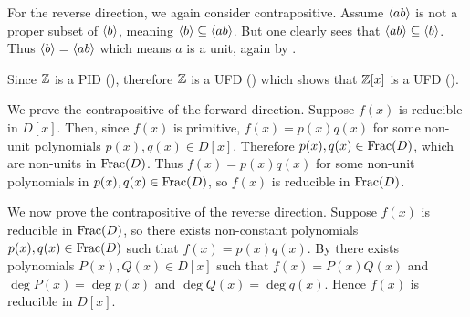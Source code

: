 \begin{questions}
    For the reverse direction, we again consider contrapositive. Assume $\left\langle ab\right\rangle$ is not a proper subset of $\left\langle b\right\rangle$, meaning $\left\langle b\right\rangle \subseteq \left\langle ab\right\rangle$. But one clearly sees that $\left\langle ab\right\rangle \subseteq \left\langle b\right\rangle$. Thus $\left\langle b\right\rangle = \left\langle ab\right\rangle$ which means $a$ is a unit, again by .

    \item Since $\mathbb{Z}$ is a PID (), therefore $\mathbb{Z}$ is a UFD () which shows that $\mathbb{Z}[x]$ is a UFD ().
    
    \item We prove the contrapositive of the forward direction. Suppose $f(x)$ is reducible in $D[x]$. Then, since $f(x)$ is primitive, $f(x) = p(x)q(x)$ for some non-unit polynomials $p(x), q(x) \in D[x]$. Therefore $p(x), q(x) \in \mathrm{Frac}(D)$, which are non-units in $\mathrm{Frac}(D)$. Thus $f(x) = p(x)q(x)$ for some non-unit polynomials in $p(x), q(x) \in \mathrm{Frac}(D)$, so $f(x)$ is reducible in $\mathrm{Frac}(D)$.

    We now prove the contrapositive of the reverse direction. Suppose $f(x)$ is reducible in $\mathrm{Frac}(D)$, so there exists non-constant polynomials $p(x), q(x) \in \mathrm{Frac}(D)$ such that $f(x) = p(x)q(x)$. By  there exists polynomials $P(x), Q(x) \in D[x]$ such that $f(x) = P(x)Q(x)$ and $\deg P(x) = \deg p(x)$ and $\deg Q(x) = \deg q(x)$. Hence $f(x)$ is reducible in $D[x]$.
\end{questions}
